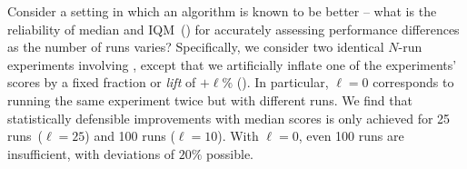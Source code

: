 Consider a setting in which an algorithm is known to be better -- what is the reliability of median and IQM~() for accurately assessing performance differences as the number of runs varies? Specifically, we consider two identical $N$-run experiments involving \spr, except that we artificially inflate one of the experiments' scores by a fixed fraction or \emph{lift} of $+\ell\%$ (). In particular, $\ell = 0$ corresponds to running the same experiment twice but with different runs.
We find that statistically defensible improvements with median scores is only achieved for 25 runs~($\ell=25$) and 100 runs ($\ell=10$). With $\ell = 0$, even 100 runs are insufficient, with deviations of $20\%$ possible.






